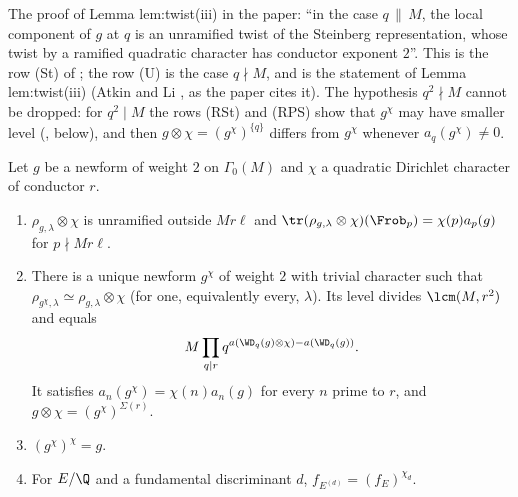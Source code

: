 \begin{paperlink}
The proof of Lemma lem:twist(iii) in the paper: ``in the case $q\,\|\,M$, the local component of $g$ at $q$ is an unramified twist of the Steinberg
representation, whose twist by a ramified quadratic character has conductor exponent $2$''. This is the row (St) of ;
the row (U) is the case $q\nmid M$, and  is the statement of Lemma lem:twist(iii) (Atkin and Li \cite[Theorem 3.1]{AtkinLi78}, as the
paper cites it). The hypothesis $q^2\nmid M$ cannot be dropped: for $q^2\mid M$ the rows (RSt) and (RPS) show that $g^\chi$ may have smaller level (,
 below), and then $g\otimes\chi=(g^\chi)^{\{q\}}$ differs from $g^\chi$ whenever $a_q(g^\chi)\ne0$.
\end{paperlink}

\begin{proposition}\label{prop:modgalrep:twists}
Let $g$ be a newform of weight $2$ on $\Gamma_0(M)$ and $\chi$ a quadratic Dirichlet character of conductor $r$.
\begin{enumerate}[label=(\roman*)]
\item $\rho_{g,\lambda}\otimes\chi$ is unramified outside $Mr\ell$ and $\tr(\rho_{g,\lambda}\otimes\chi)(\Frob_p)=\chi(p)a_p(g)$ for $p\nmid Mr\ell$.
\item There is a unique newform $g^\chi$ of weight $2$ with trivial character such that $\rho_{g^\chi,\lambda}\simeq\rho_{g,\lambda}\otimes\chi$ (for one, equivalently every, $\lambda$).
Its level divides $\lcm(M,r^2)$ and equals
\[
M\prod_{q\mid r}q^{a(\WD_q(g)\otimes\chi)-a(\WD_q(g))}.
\]
It satisfies $a_n(g^\chi)=\chi(n)a_n(g)$ for every $n$ prime to $r$, and
$g\otimes\chi=(g^\chi)^{\Sigma(r)}$.
\item $(g^\chi)^\chi=g$.
\item For $E/\Q$ and a fundamental discriminant $d$, $f_{E^{(d)}}=(f_E)^{\chi_d}$.
\end{enumerate}
\end{proposition}

